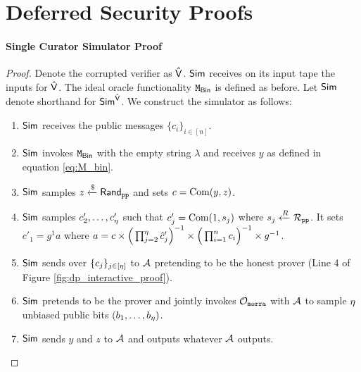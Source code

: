 \documentclass{article}
\begin{document}
\section{Deferred Security Proofs}
\label{app:single_curator_sec_proof}

\paragraph{Single Curator Simulator Proof}



\begin{proof}
Denote the corrupted verifier as $\mathsf{\hat{V}}$.  $\mathsf{Sim}$ receives on its input tape the inputs for $\mathsf{\hat{V}}$. The ideal oracle functionality $\mathtt{M}_{\mathsf{Bin}}$ is defined as before. Let $\mathsf{Sim}$ denote shorthand for $\mathsf{Sim}^{\mathsf{\hat{V}}}$. 
We construct the simulator as follows:
\begin{enumerate}    
    \item{$\mathsf{Sim}$ receives the public messages $\{c_i\}_{i \in [n]}$.}
%
    \item{$\mathsf{Sim}$ invokes $\mathtt{M}_{\mathsf{Bin}}$ with the empty string $\lambda$ and receives $y$ as defined in equation \eqref{eq:M_bin}.
    }
%    
    \item{$\mathsf{Sim}$ samples $z \xleftarrow{\$} \mathsf{Rand}_{\texttt{pp}}$ and sets $c = \operatorname{Com}(y, z)$.}

    \item{$\mathsf{Sim}$ samples $c'_{2}, \dots, c'_{{\eta}}$ such that $c'_{j} = \operatorname{Com}(1, s_{j})$ where $s_{j} \xleftarrow[]{R} \mathcal{R}_{\texttt{pp}}$. It sets $c'_{1} = g^1a$ where $a = c \times  \Big( \prod_{j=2}^{\eta} \hat{c}'_{j}\Big)^{-1} \times \Big( \prod_{i=1}^{n} c_{i}\Big)^{-1} \times g^{-1}$.
     }
%    
     \item{$\mathsf{Sim}$ sends over $\{c_{j}\}_{j \in [\eta]}$ to $\mathcal{A}$ pretending to be the honest prover (Line 4 of Figure \ref{fig:dp_interactive_proof}).
     }
	    
    \item{$\mathsf{Sim}$ pretends to be the prover and jointly invokes $\mathcal{O}_{\mathtt{morra}}$ with $\mathcal{A}$ to sample $\eta$ unbiased public bits $(b_{1}, \dots, b_{\eta})$.}
%    
    \item{$\mathsf{Sim}$ sends $y$ and $z$ to $\mathcal{A}$ and outputs whatever $\mathcal{A}$ outputs.}
\end{enumerate}
\end{proof}
%
\end{document}
